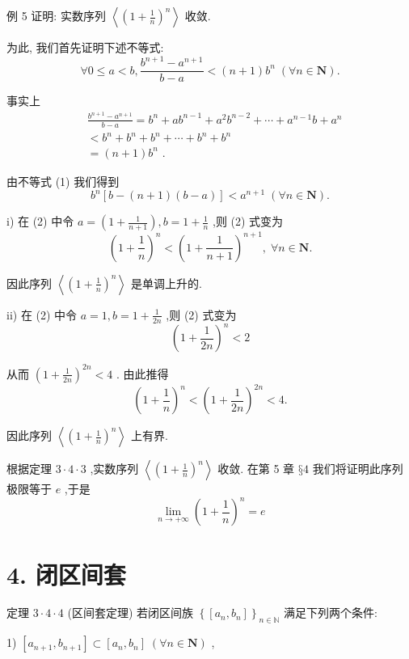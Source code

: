 例 5 证明: 实数序列 $\left\langle  {\left( 1 + \frac{1}{n}\right) }^{n}\right\rangle$ 收敛.

为此, 我们首先证明下述不等式:
$$\forall 0 \leq  a < b,\frac{{b}^{n + 1} - {a}^{n + 1}}{b - a} < \left( {n + 1}\right) {b}^{n}\;\left( {\forall n \in  \mathbf{N}}\right) . $$

事实上
\begin{align*}
	&\frac{{b}^{n + 1} - {a}^{n + 1}}{b - a} = {b}^{n} + a{b}^{n - 1} + {a}^{2}{b}^{n - 2} + \cdots  + {a}^{n - 1}b + {a}^{n}\\
	&< {b}^{n} + {b}^{n} + {b}^{n} + \cdots  + {b}^{n} + {b}^{n}\\
	&= \left( {n + 1}\right) {b}^{n}\text{ . }
\end{align*}

由不等式 (1) 我们得到
$${b}^{n}\left\lbrack  {b - \left( {n + 1}\right) \left( {b - a}\right) }\right\rbrack   < {a}^{n + 1}\;\left( {\forall n \in  \mathbf{N}}\right) . $$

i) 在 (2) 中令 $a = \left( {1 + \frac{1}{n + 1}}\right) ,b = 1 + \frac{1}{n}$ ,则 (2) 式变为
$${\left( 1 + \frac{1}{n}\right) }^{n} < {\left( 1 + \frac{1}{n + 1}\right) }^{n + 1},\;\forall n \in  \mathbf{N}.$$

因此序列 $\left\langle  {\left( 1 + \frac{1}{n}\right) }^{n}\right\rangle$ 是单调上升的.

ii) 在 (2) 中令 $a = 1,b = 1 + \frac{1}{2n}$ ,则 (2) 式变为
$${\left( 1 + \frac{1}{2n}\right) }^{n} < 2$$

从而 ${\left( 1 + \frac{1}{2n}\right) }^{2n} < 4$ . 由此推得
$${\left( 1 + \frac{1}{n}\right) }^{n} < {\left( 1 + \frac{1}{2n}\right) }^{2n} < 4.$$

因此序列 $\left\langle  {\left( 1 + \frac{1}{n}\right) }^{n}\right\rangle$ 上有界.

根据定理 $3 \cdot  4 \cdot  3$ ,实数序列 $\left\langle  {\left( 1 + \frac{1}{n}\right) }^{n}\right\rangle$ 收敛. 在第 5 章 $§4$ 我们将证明此序列极限等于 $e$ ,于是
$$\mathop{\lim }\limits_{{n \rightarrow   + \infty }}{\left( 1 + \frac{1}{n}\right) }^{n} = e$$

\section*{4. 闭区间套}

定理 $3 \cdot  4 \cdot  4$ (区间套定理) 若闭区间族 ${\left\{  \left\lbrack  {a}_{n},{b}_{n}\right\rbrack  \right\}  }_{n \in  \mathbb{N}}$ 满足下列两个条件:

1) $\left\lbrack  {{a}_{n + 1},{b}_{n + 1}}\right\rbrack   \subset  \left\lbrack  {{a}_{n},{b}_{n}}\right\rbrack  \;\left( {\forall n \in  \mathbf{N}}\right)$ ,

